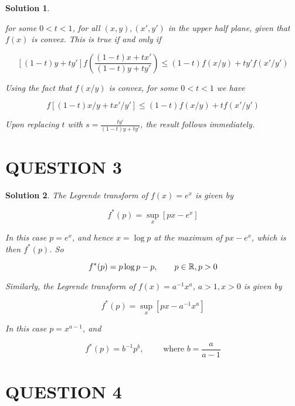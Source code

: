 \documentclass[a4paper]{article}
\newtheorem*{soln}{Solution}
\begin{document}
\begin{soln}
\begin{enumerate}
	for some $0 < t < 1 $, for all $ (x,y), (x',y') $ in the upper half plane, given that $ f(x) $ is convex. This is true if and only if
	
	\[ \left[ (1-t)y + t y' \right] f \left( \frac{(1-t)x + t x'}{(1-t)y + t y'} \right)  \leq (1-t)f(x/y) + t y' f(x' / y') \]
	
	Using the fact that $ f(x/y) $ is convex, for some $ 0 < t < 1 $ we have
	
	\[ f \left[ (1-t)x/y + t x'/y' \right]  \leq (1-t)f(x/y) + t f(x'/y')  \]
	
	Upon replacing $ t  $  with $ s = \frac{ty'}{(1-t)y + ty'} $, the result follows immediately. 
\end{enumerate}
\end{soln}



\section{QUESTION 3}

	
\begin{soln}
The Legrende transform of $ f(x) = e^{x} $ is given by

\[ f^{*}(p) = \sup_{x} \left[ px - e^{x} \right]  \]

In this case $ p = e^{x} $, and hence $ x = \log p $ at the maximum of $ px - e^{x} $, which is then $ f^{*}(p) $. So

\[ f^{*}(p) = p \log p - p, \qquad p \in \mathbb{R}, p > 0 \]

Similarly, the Legrende transform of $ f(x) = a^{-1}x^{a} $, $ a > 1, x > 0 $ is given by

\[ f^{*}(p) = \sup_{x} \left[ px - a^{-1}x^{a} \right]  \]

In this case $ p = x^{a-1} $, and 

\[ f^{*}(p) = b^{-1}p^{b}, \qquad \text{ where } b = \frac{a}{a-1}  \]

\end{soln}	

	


\section{QUESTION 4}
\end{document}
